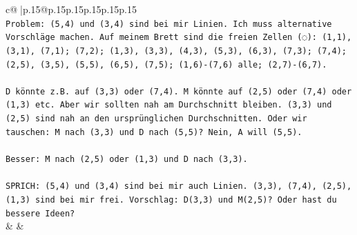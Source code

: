 \documentclass{article}
\begin{document}
{\begin{supertabular}{c@{$\;$}|p{.15\linewidth}@{}p{.15\linewidth}p{.15\linewidth}p{.15\linewidth}p{.15\linewidth}p{.15\linewidth}}
{{{\\ 
\texttt{Problem: (5,4) und (3,4) sind bei mir Linien. Ich muss alternative Vorschläge machen. Auf meinem Brett sind die freien Zellen (◌): (1,1), (3,1), (7,1); (7,2); (1,3), (3,3), (4,3), (5,3), (6,3), (7,3); (7,4); (2,5), (3,5), (5,5), (6,5), (7,5); (1,6){-}(7,6) alle; (2,7){-}(6,7).} \\
\\ 
\texttt{D könnte z.B. auf (3,3) oder (7,4). M könnte auf (2,5) oder (7,4) oder (1,3) etc. Aber wir sollten nah am Durchschnitt bleiben. (3,3) und (2,5) sind nah an den ursprünglichen Durchschnitten. Oder wir tauschen: M nach (3,3) und D nach (5,5)? Nein, A will (5,5). } \\
\\ 
\texttt{Besser: M nach (2,5) oder (1,3) und D nach (3,3). } \\
\\ 
\texttt{SPRICH: (5,4) und (3,4) sind bei mir auch Linien. (3,3), (7,4), (2,5), (1,3) sind bei mir frei. Vorschlag: D(3,3) und M(2,5)? Oder hast du bessere Ideen?} \\
            }
        }
    }
    & & \\ \\


\end{supertabular}}
\end{document}
